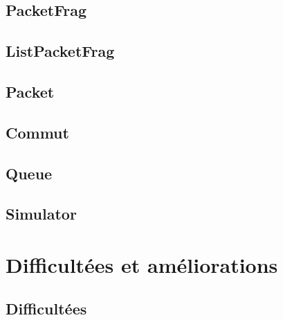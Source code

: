 \documentclass{beamer}
\newcommand{\FSource}[1]{%
  
  }
\begin{document}
\frame{\FSource{sources/trame.h}}

\frame{\FSource{sources/automate.c}}

\subsection{PacketFrag}

\frame{\FSource{sources/packetfrag.h}}

\subsection{ListPacketFrag}

\frame{\FSource{sources/listpacketfrag.h}}

\subsection{Packet}

\frame{\FSource{sources/packet.h}}

\subsection{Commut}

\frame{\FSource{sources/commut.h}}

\subsection{Queue}

\frame{\FSource{sources/queue.h}}



\subsection{Simulator}

\frame{\FSource{sources/simulator.c}}
\frame{\FSource{sources/in.c}}
\frame{\FSource{sources/out.c}}

\section{Difficultées et améliorations}

\subsection{Difficultées}
\end{document}
